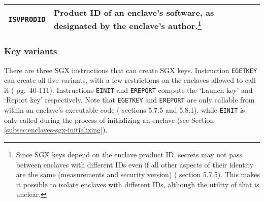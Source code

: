 \begin{tabularx}{\textwidth}{|l|X|}
\hline
    {\tt ISVPRODID} & Product ID of an enclave's software, as designated by the enclave's author.\footnote{Since SGX keys depend on the enclave product ID, secrets may not pass between enclaves with different IDs even if all other aspects of their identity are the same (measurements and security version) (\cite{intel-sgx-explained-advanced} section 5.7.5). This makes it possible to isolate enclaves with different IDs, although the utility of that is unclear.} \\
\hline
\end{tabularx}

\subsubsection{Key variants}

There are three SGX instructions that can create SGX keys. Instruction {\tt EGETKEY} can create all five variants, with a few restrictions on the enclaves allowed to call it (\cite{sgx-manual} pg.\ 40-111). Instructions {\tt EINIT} and {\tt EREPORT} compute the `Launch key' and `Report key' respectively. Note that {\tt EGETKEY} and {\tt EREPORT} are only callable from within an enclave's executable code (\cite{intel-sgx-explained-advanced} sections 5.7.5 and 5.8.1), while {\tt EINIT} is only called during the process of initializing an enclave (see Section \ref{subsec:enclaves-sgx-initializing}).

